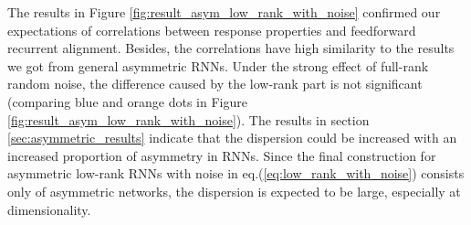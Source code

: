 \documentclass[11pt]{article}
\begin{document}
	The results in Figure \ref{fig:result_asym_low_rank_with_noise} confirmed our expectations of correlations between response properties and feedforward recurrent alignment. Besides, the correlations have high similarity to the results we got from general asymmetric RNNs. Under the strong effect of full-rank random noise, the difference caused by the low-rank part is not significant (comparing blue and orange dots in Figure \ref{fig:result_asym_low_rank_with_noise}). The results in section \ref{sec:asymmetric_results} indicate that the dispersion could be increased with an increased proportion of asymmetry in RNNs. Since the final construction for asymmetric low-rank RNNs with noise in eq.(\ref{eq:low_rank_with_noise}) consists only of asymmetric networks, the dispersion is expected to be large, especially at dimensionality. 
		\vspace{-0.2cm}
\end{document}
